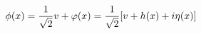 \begin{equation}\phi(x)=
{1\over \sqrt 2} v + \varphi(x) = {1\over \sqrt 2}[ v + h(x) + i
\eta(x)]\end{equation}

